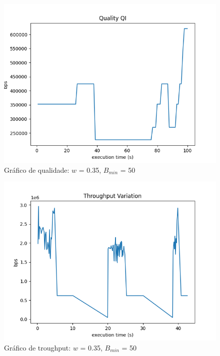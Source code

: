 \documentclass[10pt,twocolumn,letterpaper]{article}
\begin{document}
	\begin{figure}
		\centering
		\includegraphics[width=\linewidth]{0.35 - 50 - qual.png}
		\caption{Gráfico de qualidade: $w$ = 0.35, $B_{min}$ = 50}
		\label{fig:3}
	\end{figure}
	\begin{figure}
		\centering
		\includegraphics[width=\linewidth]{0.35 - 50 - Throughput .png}
		\caption{Gráfico de troughput: $w$ = 0.35, $B_{min}$ = 50}
		\label{fig:4}
	\end{figure}
	
\end{document}
